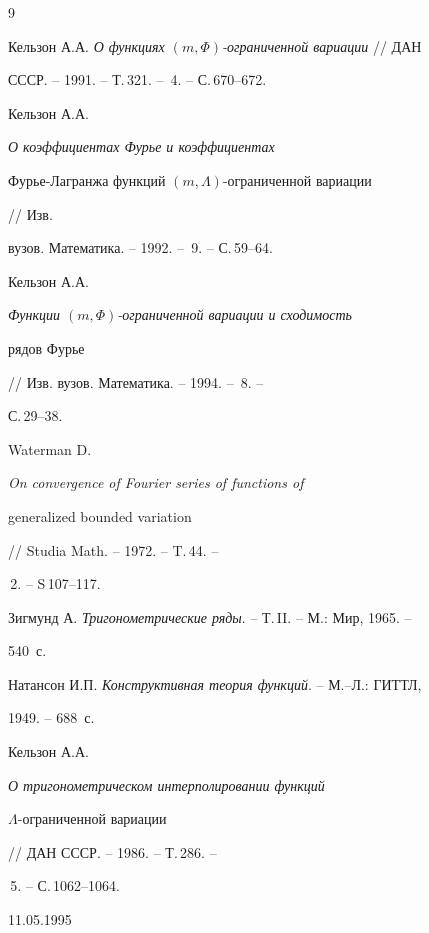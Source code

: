 \begin{thebibliography}{9}







Кельзон А.А. {\em О функциях $(m,\Phi)$-ограниченной вариации} // ДАН


СССР. -- 1991. -- Т.\,321. -- \No\,4. -- С.\,670--672.




Кельзон А.А. {\em О коэффициентах Фурье и коэффициентах


Фурье-Лагранжа функций $(m,\Lambda)$-ограниченной вариации} // Изв.


вузов. Математика. -- 1992. -- \No\,9. -- С.\,59--64.




Кельзон А.А. {\em Функции $(m,\Phi)$-ограниченной вариации и сходимость


рядов Фурье} // Изв. вузов. Математика. -- 1994. -- \No\,8. --


С.\,29--38.




Waterman D. {\em On convergence of Fourier series of functions of


generalized bounded variation} // Studia Math. -- 1972. -- T.\,44. --


\No\,2. -- S\,107--117.




Зигмунд А. {\em Тригонометрические ряды}. -- Т.\,II. -- М.: Мир, 1965. --


540~с.




Натансон И.П. {\em Конструктивная теория функций}. -- М.--Л.: ГИТТЛ,


1949. -- 688~с.




Кельзон А.А. {\em О тригонометрическом интерполировании функций


$\Lambda$-ограниченной вариации} // ДАН СССР. -- 1986. -- Т.\,286. --


\No\,5. -- С.\,1062--1064.








\end{thebibliography}





\vskip 2cm







%


{11.05.1995}






